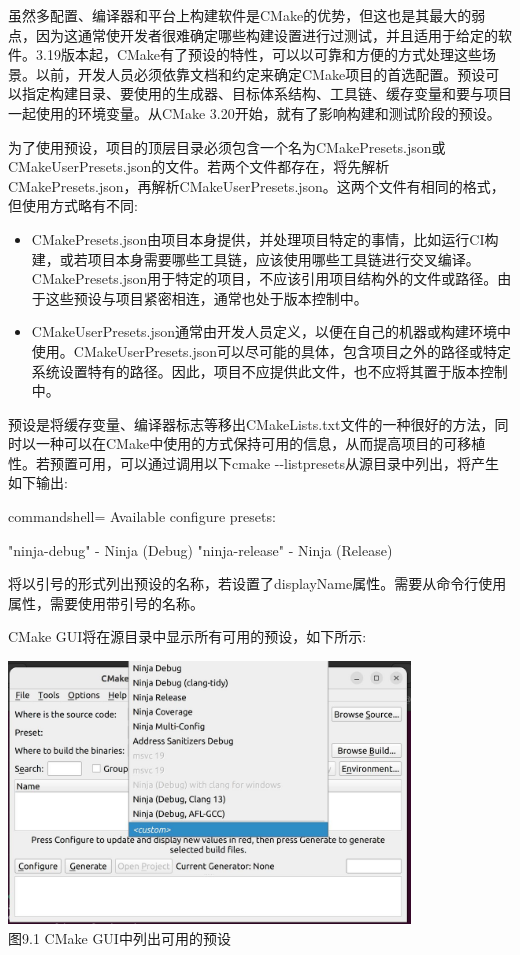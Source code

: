 虽然多配置、编译器和平台上构建软件是CMake的优势，但这也是其最大的弱点，因为这通常使开发者很难确定哪些构建设置进行过测试，并且适用于给定的软件。3.19版本起，CMake有了预设的特性，可以以可靠和方便的方式处理这些场景。以前，开发人员必须依靠文档和约定来确定CMake项目的首选配置。预设可以指定构建目录、要使用的生成器、目标体系结构、工具链、缓存变量和要与项目一起使用的环境变量。从CMake 3.20开始，就有了影响构建和测试阶段的预设。

为了使用预设，项目的顶层目录必须包含一个名为CMakePresets.json或CMakeUserPresets.json的文件。若两个文件都存在，将先解析CMakePresets.json，再解析CMakeUserPresets.json。这两个文件有相同的格式，但使用方式略有不同:

\begin{itemize}
\item 
CMakePresets.json由项目本身提供，并处理项目特定的事情，比如运行CI构建，或若项目本身需要哪些工具链，应该使用哪些工具链进行交叉编译。CMakePresets.json用于特定的项目，不应该引用项目结构外的文件或路径。由于这些预设与项目紧密相连，通常也处于版本控制中。

\item 
CMakeUserPresets.json通常由开发人员定义，以便在自己的机器或构建环境中使用。CMakeUserPresets.json可以尽可能的具体，包含项目之外的路径或特定系统设置特有的路径。因此，项目不应提供此文件，也不应将其置于版本控制中。
\end{itemize}

预设是将缓存变量、编译器标志等移出CMakeLists.txt文件的一种很好的方法，同时以一种可以在CMake中使用的方式保持可用的信息，从而提高项目的可移植性。若预置可用，可以通过调用以下cmake -{}-listpresets从源目录中列出，将产生如下输出:

\begin{tcblisting}{commandshell={}}
Available configure presets:

  "ninja-debug" - Ninja (Debug)
  "ninja-release" - Ninja (Release)
\end{tcblisting}

将以引号的形式列出预设的名称，若设置了displayName属性。需要从命令行使用属性，需要使用带引号的名称。

CMake GUI将在源目录中显示所有可用的预设，如下所示:

\begin{center}
\includegraphics[width=0.8\textwidth]{content/2/chapter9/images/2.jpg}\\
图9.1 CMake GUI中列出可用的预设
\end{center}


